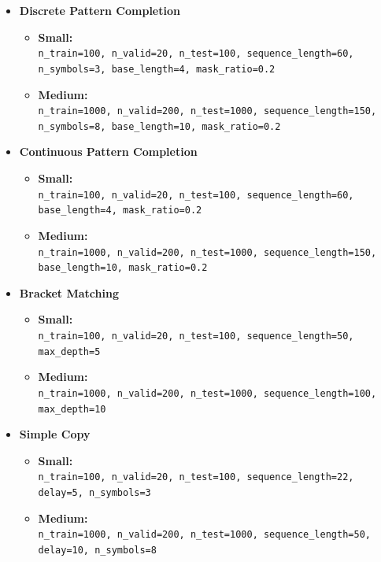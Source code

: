 \documentclass{article}
\begin{document}
\begin{itemize}
    \item \textbf{Discrete Pattern Completion}
    \begin{itemize}
        \item \textbf{Small:}\\ \texttt{n\_train=100, n\_valid=20, n\_test=100, sequence\_length=60, n\_symbols=3, base\_length=4, mask\_ratio=0.2}
        \item \textbf{Medium:}\\ \texttt{n\_train=1000, n\_valid=200, n\_test=1000, sequence\_length=150, n\_symbols=8, base\_length=10, mask\_ratio=0.2}
    \end{itemize}

    \item \textbf{Continuous Pattern Completion}
    \begin{itemize}
        \item \textbf{Small:}\\ \texttt{n\_train=100, n\_valid=20, n\_test=100, sequence\_length=60, base\_length=4, mask\_ratio=0.2}
        \item \textbf{Medium:}\\ \texttt{n\_train=1000, n\_valid=200, n\_test=1000, sequence\_length=150, base\_length=10, mask\_ratio=0.2}
    \end{itemize}

    \item \textbf{Bracket Matching}
    \begin{itemize}
        \item \textbf{Small:}\\ \texttt{n\_train=100, n\_valid=20, n\_test=100, sequence\_length=50, max\_depth=5}
        \item \textbf{Medium:}\\ \texttt{n\_train=1000, n\_valid=200, n\_test=1000, sequence\_length=100, max\_depth=10}
    \end{itemize}

    \item \textbf{Simple Copy}
    \begin{itemize}
        \item \textbf{Small:}\\ \texttt{n\_train=100, n\_valid=20, n\_test=100, sequence\_length=22, delay=5, n\_symbols=3}
        \item \textbf{Medium:}\\ \texttt{n\_train=1000, n\_valid=200, n\_test=1000, sequence\_length=50, delay=10, n\_symbols=8}
    \end{itemize}


\end{itemize}
\end{document}
